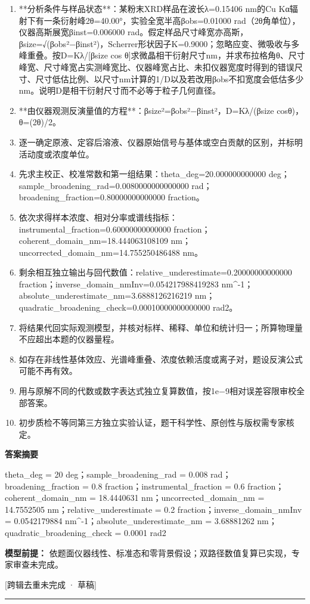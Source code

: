 \documentclass[UTF8,11pt,a4paper]{ctexart}
\begin{document}
\begin{enumerate}
\item **分析条件与样品状态**：某粉末XRD样品在波长λ=0.15406 nm的Cu Kα辐射下有一条衍射峰2θ=40.00°，实验全宽半高βobs=0.01000 rad（2θ角单位），仪器高斯展宽βinst=0.006000 rad。假定样品尺寸峰宽亦高斯，βsize=√(βobs²−βinst²)，Scherrer形状因子K=0.9000；忽略应变、微吸收与多峰重叠。按D=Kλ/[βsize cos θ]求微晶相干衍射尺寸nm，并求布拉格角θ、尺寸峰宽、尺寸峰宽占实测峰宽比、仪器峰宽占比、未扣仪器宽度时得到的错误尺寸、尺寸低估比例、以尺寸nm计算的1/D以及若改用βobs不扣宽度会低估多少nm。说明D是相干衍射尺寸而不必等于粒子几何直径。
\item **由仪器观测反演量值的方程**：βsize²=βobs²−βinst²，D=Kλ/(βsize cosθ)，θ=(2θ)/2。
\item 逐一确定原液、定容后溶液、仪器原始信号与基体或空白贡献的区别，并标明活动度或浓度单位。
\item 先求主校正、校准常数和第一组结果：theta\_deg=20.000000000000 deg；sample\_broadening\_rad=0.0080000000000000 rad；broadening\_fraction=0.80000000000000 fraction。
\item 依次求得样本浓度、相对分率或谱线指标：instrumental\_fraction=0.60000000000000 fraction；coherent\_domain\_nm=18.444063108109 nm；uncorrected\_domain\_nm=14.755250486488 nm。
\item 剩余相互独立输出与回代数值：relative\_underestimate=0.20000000000000 fraction；inverse\_domain\_nmInv=0.054217988419283 nm\textasciicircum{}-1；absolute\_underestimate\_nm=3.6888126216219 nm；quadratic\_broadening\_check=0.00010000000000000 rad2。
\item 将结果代回实际观测模型，并核对标样、稀释、单位和统计归一；所算物理量不应超出本题的仪器量程。
\item 如存在非线性基体效应、光谱峰重叠、浓度依赖活度或离子对，题设反演公式可能不再有效。
\item 用与原解不同的代数或数字表达式独立复算数值，按1e−9相对误差容限审校全部答案。
\item 初步质检不等同第三方独立实验认证，题干科学性、原创性与版权需专家核定。
\end{enumerate}
\noindent\textbf{答案摘要}\par
theta\_deg = 20 deg；sample\_broadening\_rad = 0.008 rad；broadening\_fraction = 0.8 fraction；instrumental\_fraction = 0.6 fraction；coherent\_domain\_nm = 18.4440631 nm；uncorrected\_domain\_nm = 14.7552505 nm；relative\_underestimate = 0.2 fraction；inverse\_domain\_nmInv = 0.0542179884 nm\textasciicircum{}-1；absolute\_underestimate\_nm = 3.68881262 nm；quadratic\_broadening\_check = 0.0001 rad2\par
\noindent\textbf{模型前提：}
依题面仪器线性、标准态和零背景假设；双路径数值复算已实现，专家审查未完成。\par
\noindent\textcolor{red!65!black}{[跨辑去重未完成 · 草稿]} \par
\medskip\hrule\medskip
{}
\end{document}
